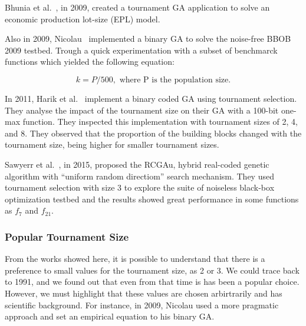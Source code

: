 Bhunia et al.~\cite{bhunia2009application}, in 2009, created a tournament GA application to solve an economic production lot-size (EPL) model. 

Also in 2009, Nicolau~\cite{nicolau2009application} implemented a binary GA to solve the noise-free BBOB 2009 testbed. Trough a quick experimentation with a subset of benchmarck functions which yielded the following equation:

\begin{equation}
	k = P/500, \text{ where P is the population size.}
\end{equation}


In 2011, Harik et al.~\cite{harik1999gambler} implement a binary coded GA using tournament selection. They analyse the impact of the tournament size on their GA with a 100-bit one-max function. They inspected this implementation with tournament sizes of 2, 4, and 8. They observed that the proportion of the building blocks changed with the tournament size, being higher for smaller tournament sizes.

Sawyerr et al.~\cite{sawyerr2015benchmarking}, in 2015, proposed the RCGAu, hybrid real-coded genetic algorithm with ``uniform random directiom'' search mechanism. They used tournament selection with size 3 to explore the suite of noiseless black-box optimization testbed and the results showed great performance in some functions as $f_7$ and $f_{21}$.

\subsubsection{Popular Tournament Size}\label{sec:background:pop_tournament_size} 

From the works showed here, it is possible to understand that there is a preference to small values for the tournament size, as 2 or 3. We could trace back to 1991, and we found out that even from that time is has been a popular choice. However, we must highlight that these values are chosen arbirtrarily and has scientific background. For instance, in 2009, Nicolau used a more pragmatic approach and set an empirical equation to his binary GA. 




